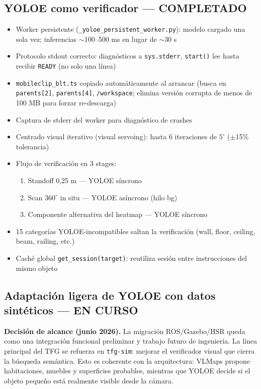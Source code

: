 \documentclass[11pt,a4paper]{article}
\begin{document}
\subsection{YOLOE como verificador --- \textcolor{done}{COMPLETADO}}

\begin{itemize}
  \item[\checkmark] Worker persistente (\texttt{\_yoloe\_persistent\_worker.py}): modelo
        cargado una sola vez; inferencias $\sim$100--500 ms en lugar de $\sim$30 s
  \item[\checkmark] Protocolo stdout correcto: diagnósticos a \texttt{sys.stderr},
        \texttt{start()} lee hasta recibir \texttt{READY} (no solo una línea)
  \item[\checkmark] \texttt{mobileclip\_blt.ts} copiado automáticamente al arrancar
        (busca en \texttt{parents[2]}, \texttt{parents[4]}, \texttt{/workspace};
        elimina versión corrupta de menos de 100 MB para forzar re-descarga)
  \item[\checkmark] Captura de stderr del worker para diagnóstico de crashes
  \item[\checkmark] Centrado visual iterativo (visual servoing): hasta 6 iteraciones de $5^\circ$
        ($\pm$15\% tolerancia)
  \item[\checkmark] Flujo de verificación en 3 stages:
    \begin{enumerate}
      \item Standoff 0,25 m --- YOLOE síncrono
      \item Scan $360^\circ$ in situ --- YOLOE asíncrono (hilo bg)
      \item Componente alternativa del heatmap --- YOLOE síncrono
    \end{enumerate}
  \item[\checkmark] 15 categorías YOLOE-incompatibles saltan la verificación
        (wall, floor, ceiling, beam, railing, etc.)
  \item[\checkmark] Caché global \texttt{get\_session(target)}: reutiliza sesión entre
        instrucciones del mismo objeto
\end{itemize}

\subsection{Adaptación ligera de YOLOE con datos sintéticos --- \textcolor{partialcol}{EN CURSO}}

\textbf{Decisión de alcance (junio 2026).} La migración ROS/Gazebo/HSR queda
como una integración funcional preliminar y trabajo futuro de ingeniería. La
línea principal del TFG se refuerza en \texttt{tfg-sim}: mejorar el verificador
visual que cierra la búsqueda semántica. Esto es coherente con la arquitectura:
VLMaps propone habitaciones, muebles y superficies probables, mientras que
YOLOE decide si el objeto pequeño está realmente visible desde la cámara.
\end{document}
